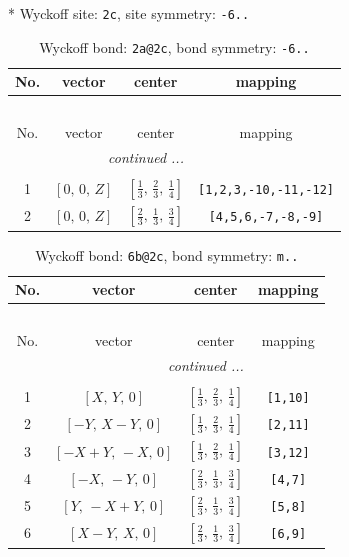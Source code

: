 \documentclass[fleqn,8pt]{jsarticle}
\begin{document}
* Wyckoff site: {\tt 2c}, site symmetry: {\tt -6..}
\renewcommand{\arraystretch}{1.2}
\begin{longtable}{cccc}
\caption{Wyckoff bond: {\tt 2a@2c}, bond symmetry: {\tt -6..}}
 \\
 \hline \hline
No. & vector & center & mapping \\ \hline \endfirsthead

\multicolumn{3}{l}{\tablename\ \thetable{}} \\
 \hline \hline
No. & vector & center & mapping \\ \hline \endhead

 \hline \hline
\multicolumn{3}{r}{\footnotesize\it continued ...} \\ \endfoot

 \hline \hline
\multicolumn{3}{r}{} \\ \endlastfoot

1 & $\left[ 0,\, 0,\, Z \right]$ & $\left[ \frac{1}{3},\, \frac{2}{3},\, \frac{1}{4} \right]$ & {\tt [1,2,3,-10,-11,-12]} \\ \hline
2 & $\left[ 0,\, 0,\, Z \right]$ & $\left[ \frac{2}{3},\, \frac{1}{3},\, \frac{3}{4} \right]$ & {\tt [4,5,6,-7,-8,-9]} \\
\end{longtable}
\renewcommand{\arraystretch}{1.2}
\begin{longtable}{cccc}
\caption{Wyckoff bond: {\tt 6b@2c}, bond symmetry: {\tt m..}}
 \\
 \hline \hline
No. & vector & center & mapping \\ \hline \endfirsthead

\multicolumn{3}{l}{\tablename\ \thetable{}} \\
 \hline \hline
No. & vector & center & mapping \\ \hline \endhead

 \hline \hline
\multicolumn{3}{r}{\footnotesize\it continued ...} \\ \endfoot

 \hline \hline
\multicolumn{3}{r}{} \\ \endlastfoot

1 & $\left[ X,\, Y,\, 0 \right]$ & $\left[ \frac{1}{3},\, \frac{2}{3},\, \frac{1}{4} \right]$ & {\tt [1,10]} \\ \hline
2 & $\left[ - Y,\, X - Y,\, 0 \right]$ & $\left[ \frac{1}{3},\, \frac{2}{3},\, \frac{1}{4} \right]$ & {\tt [2,11]} \\ \hline
3 & $\left[ - X + Y,\, - X,\, 0 \right]$ & $\left[ \frac{1}{3},\, \frac{2}{3},\, \frac{1}{4} \right]$ & {\tt [3,12]} \\ \hline
4 & $\left[ - X,\, - Y,\, 0 \right]$ & $\left[ \frac{2}{3},\, \frac{1}{3},\, \frac{3}{4} \right]$ & {\tt [4,7]} \\ \hline
5 & $\left[ Y,\, - X + Y,\, 0 \right]$ & $\left[ \frac{2}{3},\, \frac{1}{3},\, \frac{3}{4} \right]$ & {\tt [5,8]} \\ \hline
6 & $\left[ X - Y,\, X,\, 0 \right]$ & $\left[ \frac{2}{3},\, \frac{1}{3},\, \frac{3}{4} \right]$ & {\tt [6,9]} \\
\end{longtable}
\end{document}
